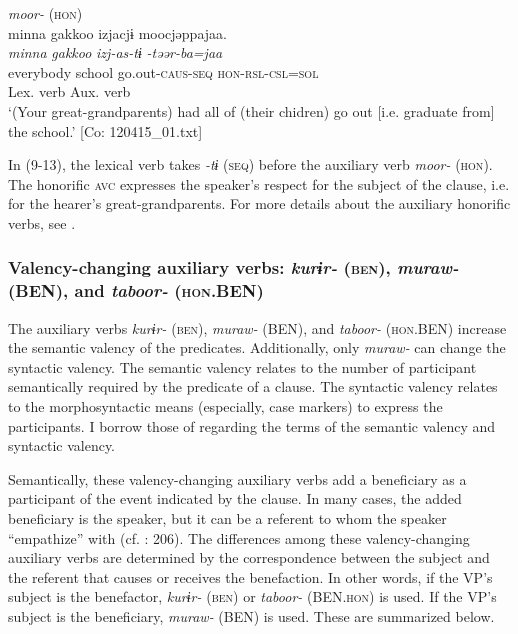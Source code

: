 \ea   \textit{moor-} (\textsc{hon}) \label{ex:9.13}\\
 \gllll  minna  {\textbar}gakkoo{\textbar}  izjacjɨ  moocjəppajaa.\\
    \textit{minna}  \textit{gakkoo}  \textit{izj-as-tɨ}  \textit{-təər-ba=jaa}\\
    everybody  school  go.out-\textsc{caus}-\textsc{seq}  \textsc{hon}-\textsc{rsl}-\textsc{csl}=\textsc{sol}\\
      {} {}  {Lex. verb}  {Aux. verb}\\
    \glt     ‘(Your great-grandparents) had all of (their chidren) go out [i.e. graduate from] the school.’ [Co: 120415\_01.txt]
\z

In (9-13), the lexical verb takes \textit{{}-tɨ} (\textsc{seq}) before the auxiliary verb \textit{moor-} (\textsc{hon}). The honorific \textsc{avc} expresses the speaker’s respect for the subject of the clause, i.e. for the hearer’s great-grandparents. For more details about the auxiliary honorific verbs, see .

\subsubsection{Valency-changing auxiliary verbs: \textit{kurɨr-} (\textsc{ben}), \textit{muraw-} (BEN), and \textit{taboor-} (\textsc{hon}.BEN)}\label{sec:9.1.1.3}

The auxiliary verbs \textit{kurɨr-} (\textsc{ben}), \textit{muraw-} (BEN), and \textit{taboor-} (\textsc{hon}.BEN) increase the semantic valency of the predicates. Additionally, only \textit{muraw-} can change the syntactic valency. The semantic valency relates to the number of participant semantically required by the predicate of a clause. The syntactic valency relates to the morphosyntactic means (especially, case markers) to express the participants. I borrow those of \citet[169-173]{Payne1997} regarding the terms of the semantic valency and syntactic valency.

Semantically, these valency-changing auxiliary verbs add a beneficiary as a participant of the event indicated by the clause. In many cases, the added beneficiary is the speaker, but it can be a referent to whom the speaker “empathize” with (cf. \citealt{Kuno1987}: 206). The differences among these valency-changing auxiliary verbs are determined by the correspondence between the subject and the referent that causes or receives the benefaction. In other words, if the VP’s subject is the benefactor, \textit{kurɨr-} (\textsc{ben}) or \textit{taboor-} (BEN.\textsc{hon}) is used. If the VP’s subject is the beneficiary, \textit{muraw-} (BEN) is used. These are summarized below.

